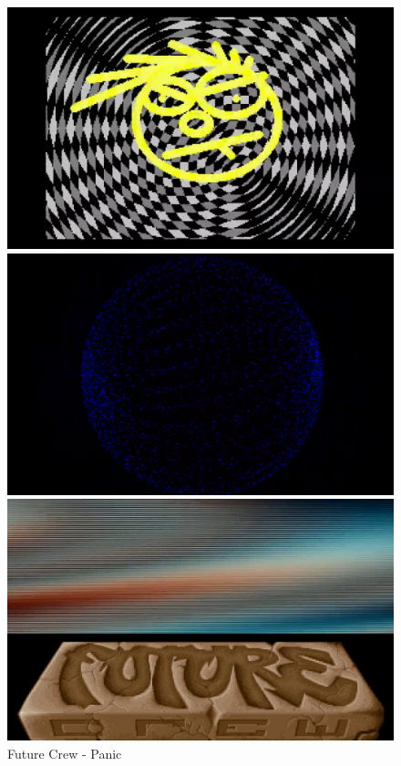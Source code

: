 \begin{figure}[h]
  \begin{minipage}[b]{0.30\linewidth}
    \centering
    \includegraphics[width=\linewidth]{images/demoscene/demos/futur4.png}
  \end{minipage}
  \hfill
  \begin{minipage}[b]{0.30\linewidth}
    \centering
    \includegraphics[width=\linewidth]{images/demoscene/demos/futur5.png}
  \end{minipage}
  \hfill
  \begin{minipage}[b]{0.30\linewidth}
    \centering
    \includegraphics[width=\linewidth]{images/demoscene/demos/futur6.png}
  \end{minipage}
  \caption{Future Crew - Panic}
  \label{panic}
\end{figure}


